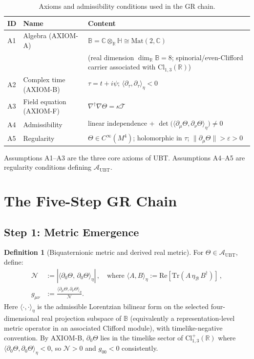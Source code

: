 \documentclass[12pt,a4paper]{article}
\theoremstyle{definition}
\newtheorem{definition}[theorem]{Definition}
\theoremstyle{remark}
\newcommand{\BB}{\mathbb{B}}
\newcommand{\CC}{\mathbb{C}}
\newcommand{\RR}{\mathbb{R}}
\newcommand{\HH}{\mathbb{H}}
\newcommand{\calA}{\mathcal{A}}
\newcommand{\calN}{\mathcal{N}}
\newcommand{\calT}{\mathcal{T}}
\begin{document}
\begin{table}[ht]
\centering
\caption{Axioms and admissibility conditions used in the GR chain.}
\label{tab:axioms}
\begin{tabular}{lll}
\toprule
\textbf{ID} & \textbf{Name} & \textbf{Content} \\
\midrule
A1 & Algebra (AXIOM-A) & $\BB = \CC\otimes_\RR\HH \cong \mathrm{Mat}(2,\CC)$ \\
   & & (real dimension $\dim_\RR\BB=8$; spinorial/even-Clifford carrier associated with $\mathrm{Cl}_{1,3}(\RR)$) \\
A2 & Complex time (AXIOM-B) & $\tau = t+i\psi$; $\langle\partial_\tau,\partial_\tau\rangle_\eta < 0$ \\
A3 & Field equation (AXIOM-F) & $\nabla^\dagger\nabla\Theta = \kappa\calT$ \\
A4 & Admissibility & linear independence + $\det\!\big(\langle\partial_\mu\Theta,\partial_\nu\Theta\rangle_\eta\big)\neq 0$ \\
A5 & Regularity & $\Theta \in C^\infty(M^4)$; holomorphic in $\tau$;
                   $\|\partial_\mu\Theta\| > \varepsilon > 0$ \\
\bottomrule
\end{tabular}
\end{table}

Assumptions A1--A3 are the three core axioms of UBT.
Assumptions A4--A5 are regularity conditions defining $\calA_{\mathrm{UBT}}$.

\section{The Five-Step GR Chain}
\label{sec:chain}

\subsection{Step 1: Metric Emergence}
\label{sec:step1}

\begin{definition}[Biquaternionic metric and derived real metric]
\label{def:metric}
For $\Theta \in \calA_{\mathrm{UBT}}$, define:
\begin{align}
  \calN &:= \left|\langle \partial_0\Theta,\, \partial_0\Theta \rangle_\eta\right| \,,
  \quad \text{where } \langle A, B\rangle_\eta
  := \mathrm{Re}[\mathrm{Tr}(A\,\eta_{\mathcal{B}}\,B^\dagger)]\,, \\
  g_{\mu\nu} &:= \frac{\langle \partial_\mu\Theta, \partial_\nu\Theta \rangle_\eta}{\calN}.
\end{align}
Here $\langle\cdot,\cdot\rangle_\eta$ is the admissible Lorentzian bilinear form on the selected
four-dimensional real projection subspace of $\BB$ (equivalently a representation-level
metric operator in an associated Clifford module), with timelike-negative convention.
By AXIOM-B, $\partial_0\Theta$ lies in the timelike sector of
$\mathrm{Cl}^+_{1,3}(\RR)$ where
$\langle \partial_0\Theta,\partial_0\Theta\rangle_\eta < 0$,
so $\calN > 0$ and $g_{00}<0$ consistently.
\end{definition}
\end{document}
